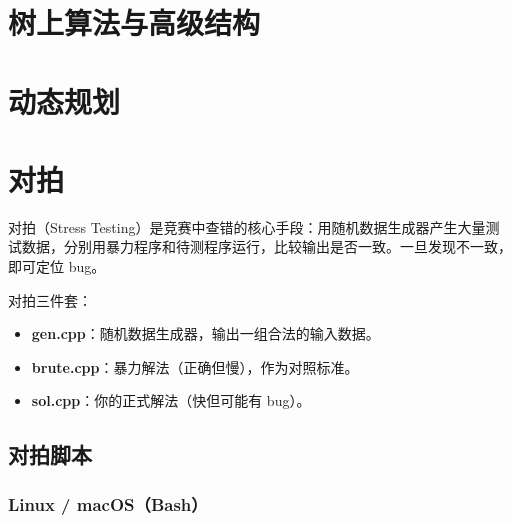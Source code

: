 \documentclass[UTF8,openany,oneside,zihao=-4]{ctexbook}
\newcommand{\inputnewboard}[1]{%
  {%
    \lstset{basicstyle=\newboardcodefont\small}%
  }%
}
\begin{document}
\inputnewboard{remake/large/04_数据结构.tex}
\inputnewboard{remake/large/04_数据结构_详解.tex}

\inputnewboard{remake/large/05_字符串.tex}
\inputnewboard{remake/large/05_字符串_详解.tex}

\inputnewboard{remake/large/06_图论.tex}

\chapter{树上算法与高级结构}
\inputnewboard{remake/large/07_树上进阶.tex}

\chapter{动态规划}
\inputnewboard{remake/large/08_动态规划.tex}
\inputnewboard{remake/large/08_动态规划_详解.tex}

\inputnewboard{remake/large/09_博弈.tex}
\inputnewboard{remake/large/09_博弈_详解.tex}

\inputnewboard{remake/large/10_几何.tex}
\inputnewboard{remake/large/10_几何_详解.tex}
\inputnewboard{remake/large/11_针对性测试.tex}
\inputnewboard{remake/large/13_例题与测试.tex}

\chapter{对拍}

\begin{note}
对拍（Stress Testing）是竞赛中查错的核心手段：用随机数据生成器产生大量测试数据，分别用暴力程序和待测程序运行，比较输出是否一致。一旦发现不一致，即可定位 bug。

对拍三件套：
\begin{itemize}
  \item \textbf{gen.cpp}：随机数据生成器，输出一组合法的输入数据。
  \item \textbf{brute.cpp}：暴力解法（正确但慢），作为对照标准。
  \item \textbf{sol.cpp}：你的正式解法（快但可能有 bug）。
\end{itemize}
\end{note}

\section{对拍脚本}

\subsection{Linux / macOS（Bash）}
\end{document}
